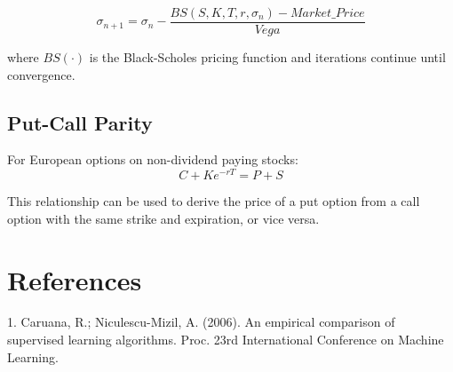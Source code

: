 \documentclass{article}
\begin{document}
\begin{equation}
\sigma_{n+1} = \sigma_n - \frac{BS(S, K, T, r, \sigma_n) - Market\_Price}{Vega}
\end{equation}

where $BS(\cdot)$ is the Black-Scholes pricing function and iterations continue until convergence.

\subsection{Put-Call Parity}
For European options on non-dividend paying stocks:
\begin{equation}
C + Ke^{-rT} = P + S
\end{equation}

This relationship can be used to derive the price of a put option from a call option with the same strike and expiration, or vice versa.

\section{References}
1. Caruana, R.; Niculescu-Mizil, A. (2006). An empirical comparison of supervised learning algorithms. Proc. 23rd International Conference on Machine Learning.
\end{document}
